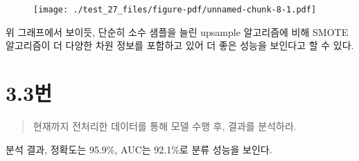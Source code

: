 \documentclass[
  letterpaper,
  DIV=11,
  numbers=noendperiod]{scrreprt}
\begin{document}
\begin{figure}[H]

{\centering \texttt{[image: ./test\_27\_files/figure-pdf/unnamed-chunk-8-1.pdf]}

}

\end{figure}

위 그래프에서 보이듯, 단순히 소수 샘플을 늘린 upsample 알고리즘에 비해
SMOTE 알고리즘이 더 다양한 차원 정보를 포함하고 있어 더 좋은 성능을
보인다고 할 수 있다.

\hypertarget{uxbc88-8}{%
\section*{3.3번}\label{uxbc88-8}}


\begin{quote}
현재까지 전처리한 데이터를 통해 모델 수행 후, 결과를 분석하라.
\end{quote}

분석 결과, 정확도는 95.9\%, AUC는 92.1\%로 분류 성능을 보인다.
\end{document}
